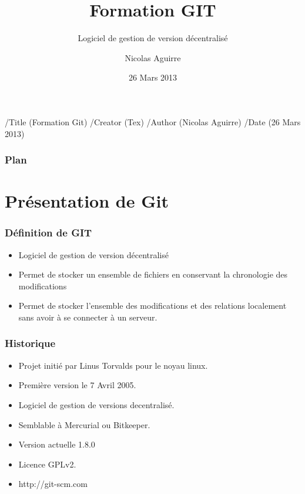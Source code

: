 \documentclass{beamer}
\begin{document}

\pdfinfo
    {
      /Title       (Formation Git)
      /Creator     (Tex)
      /Author      (Nicolas Aguirre)
      /Date        (26 Mars 2013)
    }


    \title{Formation GIT}
    \subtitle{Logiciel de gestion de version décentralisé}
    \author{Nicolas Aguirre}
    \date{26 Mars 2013}

    \frame{\titlepage}
    \begin{frame}\frametitle{Plan}
      \tableofcontents
    \end{frame}

    \section{Présentation de Git}

    \begin{frame}
      \frametitle{Définition de GIT}
      \begin{itemize}
        \item Logiciel de gestion de version décentralisé
        \item Permet de stocker un ensemble de fichiers en conservant la chronologie des modifications
        \item Permet de stocker l'ensemble des modifications et des relations localement sans avoir à se connecter à un serveur.
      \end{itemize}
    \end{frame}

    \begin{frame}
      \frametitle{Historique}
      \begin{itemize}
      \item Projet initié par Linus Torvalds pour le noyau linux.
      \item Première version le 7 Avril 2005.
      \item Logiciel de gestion de versions decentralisé.
      \item Semblable à Mercurial ou Bitkeeper.
      \item Version actuelle 1.8.0
      \item Licence GPLv2.
      \item http://git-scm.com
      \end{itemize}
    \end{frame}
\end{document}
